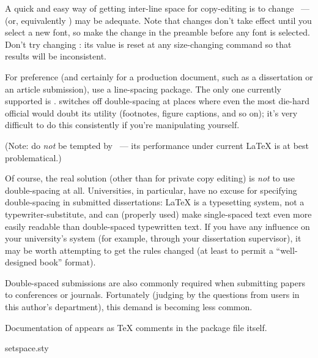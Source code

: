 
A quick and easy way of getting inter-line space for copy-editing is
to change ~---  (or,
equivalently ) may
be adequate.  Note that  changes don't take
effect until you select a new font, so make the change in the preamble
before any font is selected.  Don't try changing :
its value is reset at any size-changing command so that results will
be inconsistent.

For preference (and certainly for a production document, such as a
dissertation or an article submission), use a line-spacing package.
The only one currently supported is .
 switches off double-spacing at places where even
the most die-hard official would doubt its utility (footnotes, figure
captions, and so on); it's very difficult to do this consistently if
you're manipulating  yourself.

(Note: do \emph{not} be tempted by ~--- its
performance under current \LaTeX{} is at best problematical.)

Of course, the real solution (other than for private copy editing) is
\emph{not} to use double-spacing at all.  Universities, in particular,
have no excuse for specifying double-spacing in submitted
dissertations: \LaTeX{} is a typesetting system, not a
typewriter-substitute, and can (properly used) make single-spaced text
even more easily readable than double-spaced typewritten text.  If you
have any influence on your university's system (for example, through
your dissertation supervisor), it may be worth attempting to get the
rules changed (at least to permit a ``well-designed book'' format).

Double-spaced submissions are also commonly required when submitting
papers to conferences or journals.  Fortunately (judging by the
questions from users in this author's department), this demand is
becoming less common.

Documentation of  appears as \TeX{} comments in the
package file itself.
\begin{ctanrefs}
\item[setspace.sty]
\end{ctanrefs}


